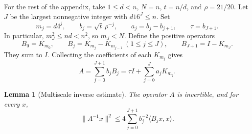 \documentclass[11pt]{article}
\newtheorem{lemma}[theorem]{Lemma}
\theoremstyle{definition}\newtheorem{definition}[theorem]{Definition}
\begin{document}
For the rest of the appendix, take $1\leq d<n$, $N=n$,
$t=n/d$, and $\rho=21/20$. Let $J$ be the largest nonnegative integer with
$d16^J\leq n$. Set
\[
  m_j=d4^j,\qquad b_j=\sqrt t\,\rho^{-j},\qquad
  a_j=b_j-b_{j+1},\qquad \tau=b_{J+1}.
\]
In particular, $m_J^2\le nd<n^2$, so $m_J<N$. Define the positive operators
\[
  B_0=K_{m_0},\qquad B_j=K_{m_j}-K_{m_{j-1}}\ (1\leq j\leq J),
  \qquad B_{J+1}=I-K_{m_J}.
\]
They sum to $I$. Collecting the coefficients of each $K_{m_j}$ gives
\[
  A=\sum_{j=0}^{J+1} b_jB_j=\tau I+\sum_{j=0}^{J}a_jK_{m_j}.
\]

\begin{lemma}[Multiscale inverse estimate]
\label{lem:multiscale-inverse}
The operator $A$ is invertible, and for every $x$,
\begin{equation}
  \label{eq:multiscale-inverse}
  \|A^{-1}x\|^2
  \leq 4\sum_{j=0}^{J+1}b_j^{-2}\langle B_jx,x\rangle.
\end{equation}
\end{lemma}
\end{document}
